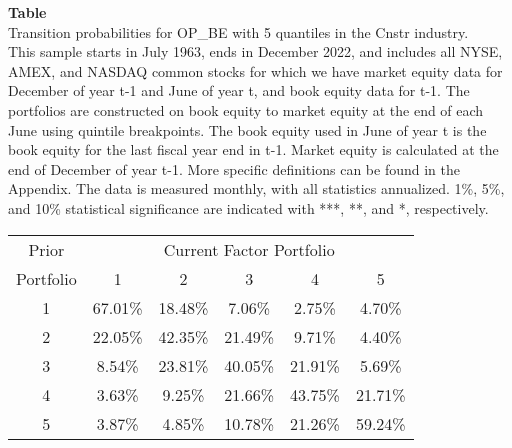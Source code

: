 \begin{table*}[ht!]
\raggedright
{}
\label{tab: transition_probs_OP_BE_Cnstr_with_5_quantiles}
\textbf{Table \thetable} \\
Transition probabilities for OP_BE with 5 quantiles in the Cnstr industry. \\
\hspace*{1em}This sample starts in July 1963, ends in December 2022, and includes all NYSE, AMEX, and NASDAQ common stocks for which we have market equity data for December of year t-1 and June of year t, and book equity data for t-1. The portfolios are constructed on book equity to market equity at the end of each June using quintile breakpoints.  The book equity used in June of year t is the book equity for the last fiscal year end in t-1.  Market equity is calculated at the end of December of year t-1.  More specific definitions can be found in the Appendix.  The data is measured monthly, with all statistics annualized.  1\%, 5\%, and 10\% statistical significance are indicated with ***, **, and *, respectively. \\
\vspace{0.5em}
\centering
\begin{adjustbox}{max width=\textwidth}
\begin{tabular}{@{}cccccc@{}}
\toprule
Prior & \multicolumn{5}{c}{Current Factor Portfolio} \\
Portfolio & 1 & 2 & 3 & 4 & 5 \\
\midrule
1 & 67.01\% & 18.48\% & 7.06\% & 2.75\% & 4.70\% \\
2 & 22.05\% & 42.35\% & 21.49\% & 9.71\% & 4.40\% \\
3 & 8.54\% & 23.81\% & 40.05\% & 21.91\% & 5.69\% \\
4 & 3.63\% & 9.25\% & 21.66\% & 43.75\% & 21.71\% \\
5 & 3.87\% & 4.85\% & 10.78\% & 21.26\% & 59.24\% \\
\bottomrule
\end{tabular}
\end{adjustbox}
\end{table*}